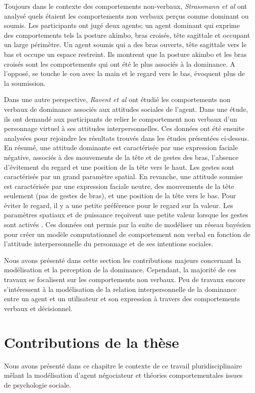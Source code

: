 		Toujours dans le contexte des comportements non-verbaux, \emph{Strassmann et al} \cite{strassmann2016effect} ont analysé quels étaient les comportements non verbaux perçus comme dominant ou soumis. 
		Les participants ont jugé deux agents;  un agent dominant qui exprime des comportements tels la posture akimbo, bras croisés, tête sagittale et occupant un large périmètre. Un agent soumis qui a des bras ouverts, tête sagittale vers le bas et occupe un espace restreint.
		Ils montrent que la posture akimbo et les bras croisés sont les comportements qui ont été le plus associés à la dominance. A l'opposé, se touche le cou avec la main et le regard vers le bas, évoquent plus de la soumission. 
		
		Dans une autre perspective,  \emph{Ravent et al} \cite{ravenet2013user} ont étudié les comportements non verbaux de dominance associés aux attitudes sociales de l'agent. Dans une étude, ils ont demandé aux participants de relier le comportement non verbaux d'un personnage virtuel à ses attitudes interpersonnelles. Ces données ont été ensuite analysées pour rejoindre les résultats trouvés dans les études présentées ci-dessus.  
		En résumé, une attitude dominante est caractérisée par une expression faciale négative, associés à des mouvements de la tête et de gestes des bras, l'absence d'évitement du regard et une position de la tête vers le haut. Les gestes sont caractérisés par un grand paramètre spatial. En revanche, une attitude soumise est caractérisée par une expression faciale neutre, des mouvements de la tête seulement (pas de gestes de bras), et une position de la tête vers le bas. Pour éviter le regard, il y a une petite préférence pour le regard sur la valeur. Les paramètres spatiaux et de puissance reçoivent une petite valeur lorsque les gestes sont activés \cite{ravenet2013user}. Ces données ont permis par la suite de
		modéliser un réseau bayésien pour créer un modèle computationnel de comportement non verbal en fonction de l'attitude interpersonnelle du personnage et de ses intentions sociales.
		
		Nous avons présenté dans cette section les contributions majeurs concernant la modélisation et la perception de la dominance. Cependant, la majorité de ces travaux se focalisent sur les comportements non verbaux. Peu de travaux encore s'intéressent à la modélisation de la relation interpersonnelle de la dominance entre un agent et un utilisateur et son expression à travers des comportements verbaux et décisionnel. 
	
	
		\section{Contributions de la thèse}
			Nous avons présenté dans ce chapitre le contexte de ce travail pluridisciplinaire mêlant la modélisation d'agent négociateur et théories comportementales issues de psychologie sociale. 
			
